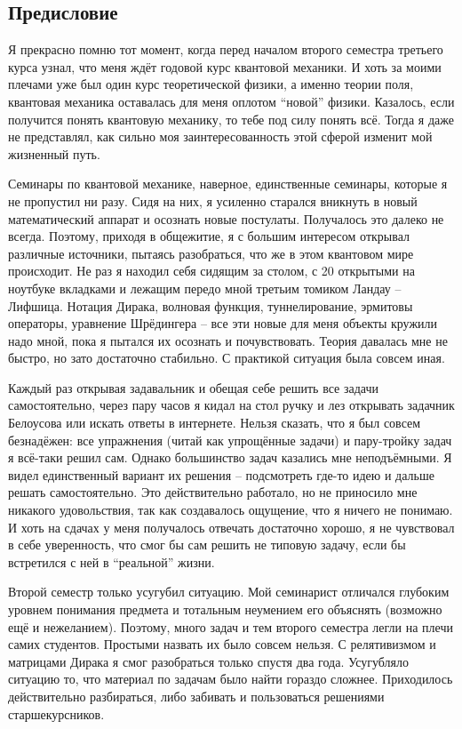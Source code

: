 \begin{center}
    \section{Предисловие}
\end{center}

Я прекрасно помню тот момент, когда перед началом второго семестра третьего курса узнал, что меня ждёт годовой курс квантовой механики. И хоть за моими плечами уже был один курс теоретической физики, а именно теории поля, квантовая механика оставалась для меня оплотом ``новой'' физики. Казалось, если получится понять квантовую механику, то тебе под силу понять всё. Тогда я даже не представлял, как сильно моя заинтересованность этой сферой изменит мой жизненный путь.

Семинары по квантовой механике, наверное, единственные семинары, которые я не пропустил ни разу. Сидя на них, я усиленно старался вникнуть в новый математический аппарат и осознать новые постулаты. Получалось это далеко не всегда. Поэтому, приходя в общежитие, я с большим интересом открывал различные источники, пытаясь разобраться, что же в этом квантовом мире происходит. Не раз я находил себя сидящим за столом, с 20 открытыми на ноутбуке вкладками и лежащим передо мной третьим томиком Ландау -- Лифшица. Нотация Дирака, волновая функция, туннелирование, эрмитовы операторы, уравнение Шрёдингера -- все эти новые для меня объекты кружили надо мной, пока я пытался их осознать и почувствовать. Теория давалась мне не быстро, но зато достаточно стабильно. С практикой ситуация была совсем иная.

Каждый раз открывая задавальник и обещая себе решить все задачи самостоятельно, через пару часов я кидал на стол ручку и лез открывать задачник Белоусова или искать ответы в интернете. Нельзя сказать, что я был совсем безнадёжен: все упражнения (читай как упрощённые задачи) и пару-тройку задач я всё-таки решил сам. Однако большинство задач казались мне неподъёмными. Я видел единственный вариант их решения -- подсмотреть где-то идею и дальше решать самостоятельно. Это действительно работало, но не приносило мне никакого удовольствия, так как создавалось ощущение, что я ничего не понимаю. И хоть на сдачах у меня получалось отвечать достаточно хорошо, я не чувствовал в себе уверенность, что смог бы сам решить не типовую задачу, если бы встретился с ней в ``реальной'' жизни.

Второй семестр только усугубил ситуацию. Мой семинарист отличался глубоким уровнем понимания предмета и тотальным неумением его объяснять (возможно ещё и нежеланием). Поэтому, много задач и тем второго семестра легли на плечи самих студентов. Простыми назвать их было совсем нельзя. С релятивизмом и матрицами Дирака я смог разобраться только спустя два года. Усугубляло ситуацию то, что материал по задачам было найти гораздо сложнее. Приходилось действительно разбираться, либо забивать и пользоваться решениями старшекурсников.


